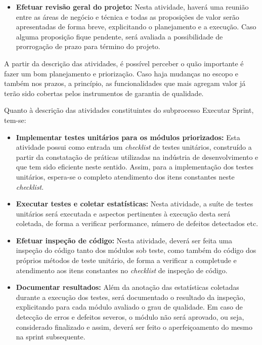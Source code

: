 \begin{itemize}
	\item \textbf{Efetuar revisão geral do projeto:} Nesta atividade, haverá uma reunião entre as áreas de negócio e técnica e todas as proposições de valor serão apresentadas de forma breve, explicitando o planejamento e a execução. Caso alguma proposição fique pendente, será avaliada a possibilidade de prorrogação de prazo para término do projeto.
\end{itemize}

A partir da descrição das atividades, é possível perceber o quão importante é fazer um bom planejamento e priorização. Caso haja mudanças no escopo e também nos prazos, a princípio, as funcionalidades que mais agregam valor já terão sido cobertas pelos instrumentos de garantia de qualidade.

Quanto à descrição das atividades constituintes do subprocesso Executar Sprint, tem-se:

\begin{itemize}
	\item \textbf{Implementar testes unitários para os módulos priorizados:} Esta atividade possui como entrada um \textit{checklist} de testes unitários, construído a partir da constatação de práticas utilizadas na indústria de desenvolvimento e que tem sido eficiente neste sentido. Assim, para a implementação dos testes unitários, espera-se o completo atendimento dos itens constantes neste \textit{checklist}.

	\item \textbf{Executar testes e coletar estatísticas:} Nesta atividade, a suíte de testes unitários será executada e aspectos pertinentes à execução desta será coletada, de forma a verificar performance, número de defeitos detectados etc.

	\item \textbf{Efetuar inspeção de código:} Nesta atividade, deverá ser feita uma inspeção do código tanto dos módulos sob teste, como também do código dos próprios métodos de teste unitário, de forma a verificar a completude e atendimento aos itens constantes no \textit{checklist} de inspeção de código.

	\item \textbf{Documentar resultados:} Além da anotação das estatísticas coletadas durante a execução dos testes, será documentado o resultado da inspeção, explicitando para cada módulo avaliado o grau de qualidade. Em caso de detecção de erros e defeitos severos, o módulo não será aprovado, ou seja, considerado finalizado e assim, deverá ser feito o aperfeiçoamento do mesmo na sprint subsequente.
\end{itemize}

